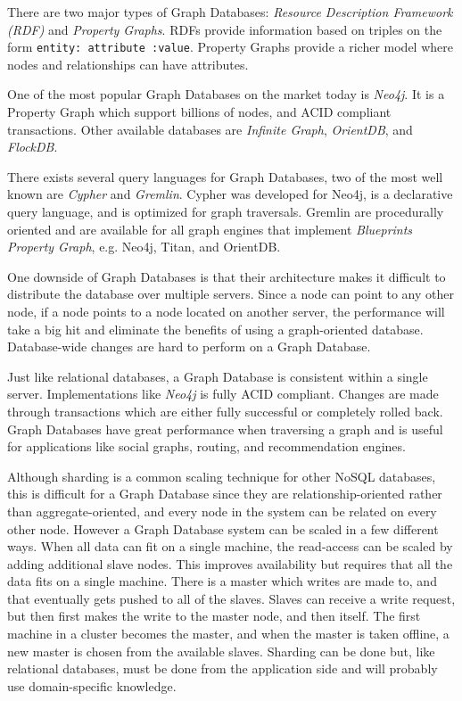 There are two major types of Graph Databases: \emph{Resource Description Framework (RDF)} and \emph{Property Graphs}. RDFs provide information based on triples on the form \texttt{entity: attribute :value}. Property Graphs provide a richer model where nodes and relationships can have attributes.

One of the most popular Graph Databases on the market today is \emph{Neo4j}. It is a Property Graph which support billions of nodes, and ACID compliant transactions. Other available databases are \emph{Infinite Graph}, \emph{OrientDB}, and \emph{FlockDB}.

There exists several query languages for Graph Databases, two of the most well known are \emph{Cypher} and \emph{Gremlin}. Cypher was developed for Neo4j, is a declarative query language, and is optimized for graph traversals. Gremlin are procedurally oriented and are available for all graph engines that implement \emph{Blueprints Property Graph}, e.g. Neo4j, Titan, and OrientDB.

One downside of Graph Databases is that their architecture makes it difficult to distribute the database over multiple servers. Since a node can point to any other node, if a node points to a node located on another server, the performance will take a big hit and eliminate the benefits of using a graph-oriented database. Database-wide changes are hard to perform on a Graph Database.

Just like relational databases, a Graph Database is consistent within a single server. Implementations like \emph{Neo4j} is fully ACID compliant. Changes are made through transactions which are either fully successful or completely rolled back. Graph Databases have great performance when traversing a graph and is useful for applications like social graphs, routing, and recommendation engines.

Although sharding is a common scaling technique for other NoSQL databases, this is difficult for a Graph Database since they are relationship-oriented rather than aggregate-oriented, and every node in the system can be related on every other node. However a Graph Database system can be scaled in a few different ways. When all data can fit on a single machine, the read-access can be scaled by adding additional slave nodes. This improves availability but requires that all the data fits on a single machine. There is a master which writes are made to, and that eventually gets pushed to all of the slaves. Slaves can receive a write request, but then first makes the write to the master node, and then itself. The first machine in a cluster becomes the master, and when the master is taken offline, a new master is chosen from the available slaves. Sharding can be done but, like relational databases, must be done from the application side and will probably use domain-specific knowledge.

